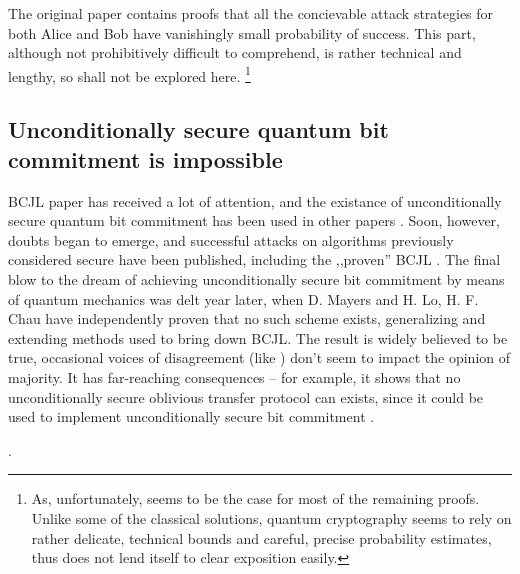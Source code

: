 \documentclass[10pt]{article}
\begin{document}
The original paper contains proofs that all the concievable attack strategies for both Alice
and Bob have vanishingly small probability of success. This part, although not prohibitively
difficult to comprehend, is rather technical and lengthy, so shall not be explored here.
\footnote{As, unfortunately, seems to be the case for most of the remaining proofs. Unlike
some of the classical solutions, quantum cryptography seems to rely on rather delicate, technical
bounds and careful, precise probability estimates, thus does not lend itself to clear exposition
easily.}

\subsection*{Unconditionally secure quantum bit commitment is impossible}

BCJL paper has received a lot of attention, and the existance of unconditionally secure quantum bit
commitment has been used in other papers \cite{Yao95}. Soon, however, doubts began to emerge, and
successful attacks on algorithms previously considered secure have been published, including the
,,proven'' BCJL \cite{Lo96,Mayers96}\footnotemark. The final blow to the dream of achieving unconditionally
secure bit commitment by means of quantum mechanics was delt year later, when D. Mayers \cite{Mayers97}
and H. Lo, H. F. Chau \cite{Lo98} have independently proven that no such scheme exists, generalizing
and extending methods used to bring down BCJL. The result is widely believed to be true, occasional
voices of disagreement (like \cite{Yuen01}) don't seem to impact the opinion of majority. It has
far-reaching consequences -- for example, it shows that no unconditionally secure oblivious transfer
protocol can exists, since it could be used to implement unconditionally secure bit commitment
\cite{Crepeau88}.

. 
\end{document}
